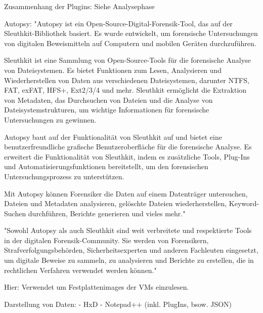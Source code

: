 	Zusammenhang der Plugins: Siehe Analysephase

	
Autopsy:
	"Autopsy ist ein Open-Source-Digital-Forensik-Tool, das auf der Sleuthkit-Bibliothek basiert. Es wurde entwickelt, um forensische Untersuchungen von digitalen Beweismitteln auf Computern und mobilen Geräten durchzuführen.

	Sleuthkit ist eine Sammlung von Open-Source-Tools für die forensische Analyse von Dateisystemen. Es bietet Funktionen zum Lesen, Analysieren und Wiederherstellen von Daten aus verschiedenen Dateisystemen, darunter NTFS, FAT, exFAT, HFS+, Ext2/3/4 und mehr. Sleuthkit ermöglicht die Extraktion von Metadaten, das Durchsuchen von Dateien und die Analyse von Dateisystemstrukturen, um wichtige Informationen für forensische Untersuchungen zu gewinnen.
	
	Autopsy baut auf der Funktionalität von Sleuthkit auf und bietet eine benutzerfreundliche grafische Benutzeroberfläche für die forensische Analyse. Es erweitert die Funktionalität von Sleuthkit, indem es zusätzliche Tools, Plug-Ins und Automatisierungsfunktionen bereitstellt, um den forensischen Untersuchungsprozess zu unterstützen.
	
	Mit Autopsy können Forensiker die Daten auf einem Datenträger untersuchen, Dateien und Metadaten analysieren, gelöschte Dateien wiederherstellen, Keyword-Suchen durchführen, Berichte generieren und vieles mehr."

	"Sowohl Autopsy als auch Sleuthkit sind weit verbreitete und respektierte Tools in der digitalen Forensik-Community. Sie werden von Forensikern, Strafverfolgungsbehörden, Sicherheitsexperten und anderen Fachleuten eingesetzt, um digitale Beweise zu sammeln, zu analysieren und Berichte zu erstellen, die in rechtlichen Verfahren verwendet werden können."
	
	Hier: Verwendet um Festplattenimages der VMs einzulesen. 

Darstellung von Daten:
	- HxD
	- Notepad++ (inkl. PlugIns, bsow. JSON)

